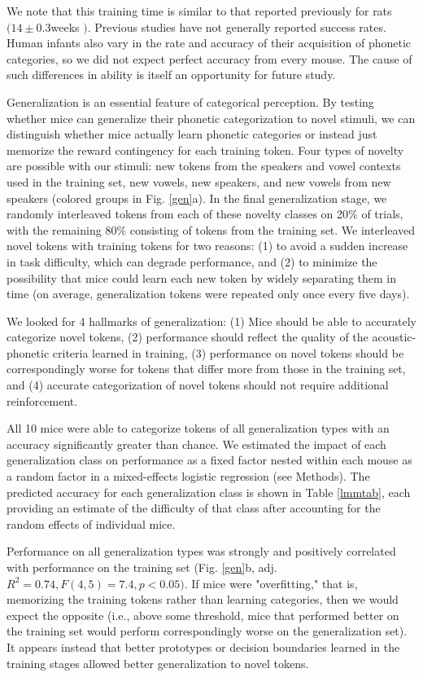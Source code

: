 We note that this training time is similar to that reported previously for rats $ (14\pm 0.3 $weeks \citep{Engineer2015}$) $. Previous studies have not generally reported success rates. Human infants also vary in the rate and accuracy of their acquisition of phonetic categories, so we did not expect perfect accuracy from every mouse. The cause of such differences in ability is itself an opportunity for future study.

Generalization is an essential feature of categorical perception. By testing whether mice can generalize their phonetic categorization to novel stimuli, we can distinguish whether mice actually learn phonetic categories or instead just memorize the reward contingency for each training token. Four types of novelty are possible with our stimuli: new tokens from the speakers and vowel contexts used in the training set, new vowels, new speakers, and new vowels from new speakers (colored groups in Fig. \ref{gen}a). In the final generalization stage, we randomly interleaved tokens from each of these novelty classes on 20\% of trials, with the remaining 80\% consisting of tokens from the training set. We interleaved novel tokens with training tokens for two reasons: (1) to avoid a sudden increase in task difficulty, which can degrade performance, and (2) to minimize the possibility that mice could learn each new token by widely separating them in time (on average, generalization tokens were repeated only once every five days).

We looked for 4 hallmarks of generalization: (1) Mice should be able to accurately categorize novel tokens, (2) performance should reflect the quality of the acoustic-phonetic criteria learned in training, (3) performance on novel tokens should be correspondingly worse for tokens that differ more from those in the training set, and (4) accurate categorization of novel tokens should not require additional reinforcement.

All 10 mice were able to categorize tokens of all generalization types with an accuracy significantly greater than chance. We estimated the impact of each generalization class on performance as a fixed factor nested within each mouse as a random factor in a mixed-effects logistic regression (see Methods). The predicted accuracy for each generalization class is shown in Table \ref{lmmtab}, each providing an estimate of the difficulty of that class after accounting for the random effects of individual mice.

Performance on all generalization types was strongly and positively correlated with performance on the training set (Fig. \ref{gen}b, adj. $R^2=0.74, F(4, 5) = 7.4, p < 0.05)$. If mice were "overfitting," that is, memorizing the training tokens rather than learning categories, then we would expect the opposite (i.e., above some threshold, mice that performed better on the training set would perform correspondingly worse on the generalization set). It appears instead that better prototypes or decision boundaries learned in the training stages allowed better generalization to novel tokens.

